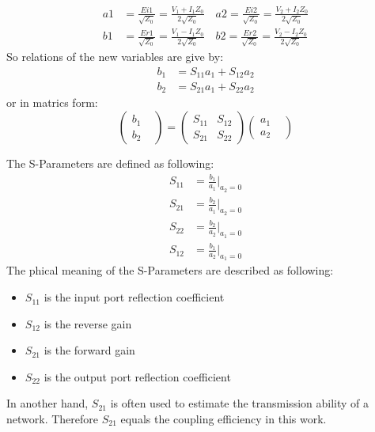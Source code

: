 \begin{align} 
a1&=\frac{Ei1}{\sqrt{Z_{0}}}=\frac{V_{1}+I_{1}Z_{0}}{2\sqrt{Z_{0}}} \quad a2=\frac{Ei2}{\sqrt{Z_{0}}}=\frac{V_{2}+I_{2}Z_{0}}{2\sqrt{Z_{0}}} \\
b1&=\frac{Er1}{\sqrt{Z_{0}}}=\frac{V_{1}-I_{1}Z_{0}}{2\sqrt{Z_{0}}}  \quad b2=\frac{Er2}{\sqrt{Z_{0}}}=\frac{V_{2}-I_{2}Z_{0}}{2\sqrt{Z_{0}}}
\end{align}
So relations of the new variables are give by:
\begin{align}
b_{1}&=S_{11}a_{1}+S_{12}a_{2}\\
b_{2}&=S_{21}a_{1}+S_{22}a_{2}
\end{align}
or in matrics form:
\begin{equation}
		\begin{pmatrix}
			b_{1}&\\
			b_{2}&
		\end{pmatrix}
	=	
		\begin{pmatrix}
			S_{11}&S_{12}\\
			S_{21}&S_{22}
		\end{pmatrix}
		\begin{pmatrix}
			a_{1}&\\
			a_{2}&
		\end{pmatrix}
\label{eq:s_matrix}
\end{equation}

The S-Parameters are defined as following:
\begin{align}
S_{11}&=\frac{b_{1}}{a_{1}}|_{a_{2}=0}\\
S_{21}&=\frac{b_{2}}{a_{1}}|_{a_{2}=0}\\
S_{22}&=\frac{b_{2}}{a_{2}}|_{a_{1}=0}\\
S_{12}&=\frac{b_{1}}{a_{2}}|_{a_{1}=0}
\end{align}
The phical meaning of the S-Parameters are described as following:
\begin{itemize}
\item $S_{11}$ is the input port reflection coefficient
\item $S_{12}$ is the reverse gain
\item $S_{21}$ is the forward gain
\item $S_{22}$ is the output port reflection coefficient
\end{itemize}
In another hand, $S_{21}$ is often used to estimate the transmission ability of a network. Therefore $S_{21}$ equals the coupling efficiency in this work.

